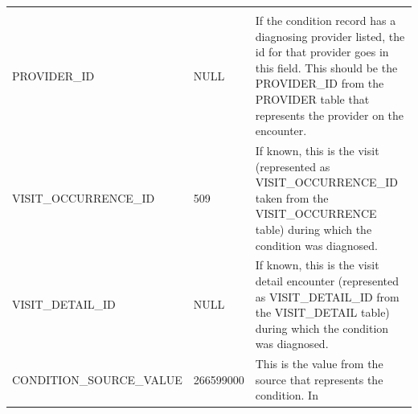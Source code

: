 \documentclass[11pt]{book}
\begin{document}
\begin{longtable}[]{@{}lll@{}}
\begin{minipage}[t]{0.48\columnwidth}
\end{minipage}\tabularnewline
\begin{minipage}[t]{0.31\columnwidth}\raggedright\strut
PROVIDER\_ID\strut
\end{minipage} & \begin{minipage}[t]{0.12\columnwidth}\raggedright\strut
NULL\strut
\end{minipage} & \begin{minipage}[t]{0.48\columnwidth}\raggedright\strut
If the condition record has a diagnosing provider listed, the id for
that provider goes in this field. This should be the PROVIDER\_ID from
the PROVIDER table that represents the provider on the encounter.\strut
\end{minipage}\tabularnewline
\begin{minipage}[t]{0.31\columnwidth}\raggedright\strut
VISIT\_OCCURRENCE\_ID\strut
\end{minipage} & \begin{minipage}[t]{0.12\columnwidth}\raggedright\strut
509\strut
\end{minipage} & \begin{minipage}[t]{0.48\columnwidth}\raggedright\strut
If known, this is the visit (represented as VISIT\_OCCURRENCE\_ID taken
from the VISIT\_OCCURRENCE table) during which the condition was
diagnosed.\strut
\end{minipage}\tabularnewline
\begin{minipage}[t]{0.31\columnwidth}\raggedright\strut
VISIT\_DETAIL\_ID\strut
\end{minipage} & \begin{minipage}[t]{0.12\columnwidth}\raggedright\strut
NULL\strut
\end{minipage} & \begin{minipage}[t]{0.48\columnwidth}\raggedright\strut
If known, this is the visit detail encounter (represented as
VISIT\_DETAIL\_ID from the VISIT\_DETAIL table) during which the
condition was diagnosed.\strut
\end{minipage}\tabularnewline
\begin{minipage}[t]{0.31\columnwidth}\raggedright\strut
CONDITION\_SOURCE\_VALUE\strut
\end{minipage} & \begin{minipage}[t]{0.12\columnwidth}\raggedright\strut
266599000\strut
\end{minipage} & \begin{minipage}[t]{0.48\columnwidth}\raggedright\strut
This is the value from the source that represents the condition. In

\end{minipage}
\end{longtable}
\end{document}
